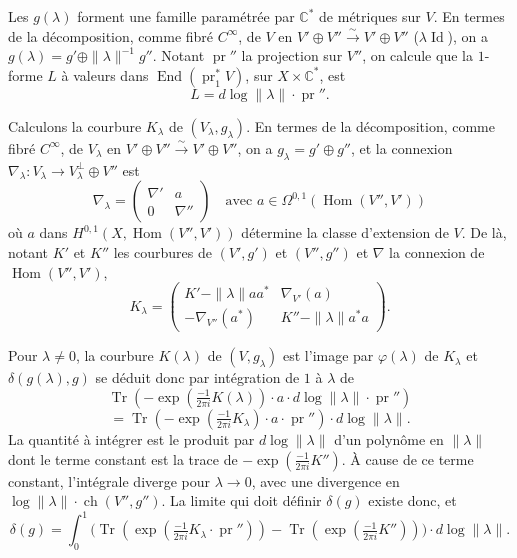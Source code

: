 \documentclass[12pt,a4paper]{article}
\theoremstyle{plain}
\theoremstyle{definition}
\DeclareMathOperator{\Tr}{Tr}
\DeclareMathOperator{\ch}{ch}
\DeclareMathOperator{\End}{End}
\DeclareMathOperator{\Hom}{Hom}
\DeclareMathOperator{\Id}{Id}
\DeclareMathOperator{\pr}{pr}
\newcommand{\CC}{\mathbb{C}}
\begin{document}
Les $g(\lambda)$ forment une famille param\'etr\'ee par $\CC^*$ de m\'etriques sur $V$.
En termes de la d\'ecomposition, comme fibr\'e $C^\infty$, de $V$ en $V' \oplus V'' \xrightarrow{\sim} V' \oplus V''$ ($\lambda \Id$),
on a $g(\lambda) = g' \oplus \|\lambda\|^{-1} g''$. Notant $\pr''$ la projection sur $V''$, on calcule
que la $1$-forme $L$ \`a valeurs dans $\End(\pr_1^* V)$, sur $X \times \CC^*$, est
\[
L = d\log \|\lambda\| \cdot \pr'' .
\]

Calculons la courbure $K_\lambda$ de $(V_\lambda, g_\lambda)$. En termes de la d\'ecomposition,
comme fibr\'e $C^\infty$, de $V_\lambda$ en $V' \oplus V'' \xrightarrow{\sim} V' \oplus V''$, on a $g_\lambda = g' \oplus g''$, et la
connexion $\nabla_\lambda: V_\lambda \to V_\lambda^\perp \oplus V''$ est
\[
\nabla_\lambda = \begin{pmatrix} \nabla' & a \\ 0 & \nabla'' \end{pmatrix} \quad \text{avec } a \in \Omega^{0,1}(\Hom(V'', V'))
\]
o\`u $a$ dans $H^{0,1}(X, \Hom(V'', V'))$ d\'etermine la classe d'extension de $V$. De l\`a, notant
$K'$ et $K''$ les courbures de $(V', g')$ et $(V'', g'')$ et $\nabla$ la connexion de $\Hom(V'',
V')$,
\[
K_\lambda = \begin{pmatrix} K' - \|\lambda\| a a^* & \nabla_{V'}(a) \\ -\nabla_{V''}(a^*) & K'' - \|\lambda\| a^* a \end{pmatrix} .
\]

Pour $\lambda \neq 0$, la courbure $K(\lambda)$ de $(V, g_\lambda)$ est l'image par $\varphi(\lambda)$ de
$K_\lambda$ et $\delta(g(\lambda), g)$ se d\'eduit donc par int\'egration de $1$ \`a $\lambda$ de
\[
\Tr(-\exp(\tfrac{-1}{2\pi i} K(\lambda)) \cdot a \cdot d\log \|\lambda\| \cdot \pr'')
\]
\[
= \Tr(-\exp(\tfrac{-1}{2\pi i} K_\lambda) \cdot a \cdot \pr'') \cdot d\log \|\lambda\| .
\]
La quantit\'e \`a int\'egrer est le produit par $d\log \|\lambda\|$ d'un polyn\^ome en $\|\lambda\|$
dont le terme constant est la trace de $-\exp(\frac{-1}{2\pi i} K'')$. \`A cause de ce terme constant,
l'int\'egrale diverge pour $\lambda \to 0$, avec une divergence en $\log \|\lambda\| \cdot \ch(V'', g'')$.
La limite qui doit d\'efinir $\delta(g)$ existe donc, et
\begin{equation}\label{eq:5.11.3}
\delta(g) = \int_0^1 \bigl(\Tr(\exp(\tfrac{-1}{2\pi i} K_\lambda \cdot \pr'')) - \Tr(\exp(\tfrac{-1}{2\pi i} K''))\bigr) \cdot d\log \|\lambda\| .
\end{equation}
\end{document}
